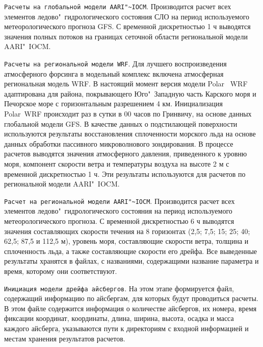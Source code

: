 \verb|Расчеты на глобальной модели AARI"~IOCM|. Производится расчет всех элементов ледово"~гидрологического состояния СЛО на период используемого метеорологического прогноза GFS. С временной дискретностью 1 ч выводятся значения полных потоков на границах сеточной области региональной модели AARI"~IOCM.  

\verb|Расчеты на региональной модели WRF|. Для лучшего воспроизведения атмосферного форсинга в модельный комплекс включена атмосферная региональная модель WRF. В настоящий момент версия модели Polar~ WRF~\cite{bromwich2009development} адаптирована для района, покрывающего Юго"~Западную часть Карского моря и Печорское море с горизонтальным разрешением 4 км. Инициализация Polar~WRF происходит раз в сутки в 00 часов по Гринвичу, на основе данных глобальной модели GFS. В качестве данных о подстилающей поверхности используются результаты восстановления сплоченности морского льда на основе данных обработки пассивного микроволнового зондирования. В процессе расчетов выводятся значения атмосферного давления, приведенного к уровню моря, компонент скорости ветра и температуры воздуха на высоте 2 м с временной дискретностью 1 ч. Эти результаты используются для расчетов по региональной модели AARI"~IOCM.

\verb|Расчет на региональной модели AARI"~IOCM|. Производится расчет всех элементов ледово"~гидрологического состояния на период используемого метеорологического прогноза. С временной дискретностью 6 ч выводятся значения составляющих скорости течения на 8 горизонтах (2,5; 7,5; 15; 25; 40; 62,5; 87,5 и 112,5 м), уровень моря, составляющие скорости ветра, толщина и сплоченность льда, а также составляющие скорости его дрейфа. Все выведенные результаты хранятся в файлах, с названиями, содержащими название параметра и время, которому они соответствуют.

\verb|Инициация модели дрейфа айсбергов|. На этом этапе формируется файл, содержащий информацию по айсбергам, для которых будут проводиться расчеты. В этом файле содержится информация о количестве айсбергов, их номера, время фиксации координат, координаты, длина, ширина, высота, осадка и масса каждого айсберга, указываются пути к директориям с входной информацией и местам хранения результатов расчетов.

